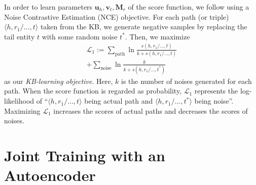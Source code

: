 \documentclass[11pt,a4paper]{article}
\newcommand{\mat}[1]{\bm{#1}}
\renewcommand{\vec}[1]{\bm{#1}}
\begin{document}
In order to learn parameters $\vec{u}_h,\vec{v}_t,\mat{M}_r$ of the score 
function, we 
follow \citet{tian-okazaki-inui:2016:P16-1} using a 
Noise Contrastive Estimation (NCE) \citep{DBLP:journals/jmlr/GutmannH12} objective. For each 
path (or triple) $\langle h,r_1/\ldots,t\rangle$ taken from the KB, 
we generate negative samples by replacing the tail entity $t$ with some 
random noise 
$t^{*}$. Then, we maximize 
\begin{multline*}
\mathcal{L}_1:=
\sum_{\text{path}}\ln\frac{s(h, r_1/\ldots, t)}{k+s(h, r_1/\ldots, t)}\\
+\sum_{\text{noise}}\ln\frac{k}{k+s(h, r_1/\ldots, t^{*})}
\end{multline*}
as our \emph{KB-learning objective}. Here, $k$ is the number of noises 
generated for each path. When the score function 
is regarded as probability, $\mathcal{L}_1$ represents 
the log-likelihood of 
``$\langle h,r_1/\ldots,t\rangle$ being actual path and 
$\langle h,r_1/\ldots,t^{*}\rangle$ being noise''. Maximizing $\mathcal{L}_1$ 
increases the scores of actual paths and decreases the scores of noises.

\section{Joint Training with an Autoencoder}
\label{sec:jointtraining}



\end{document}
